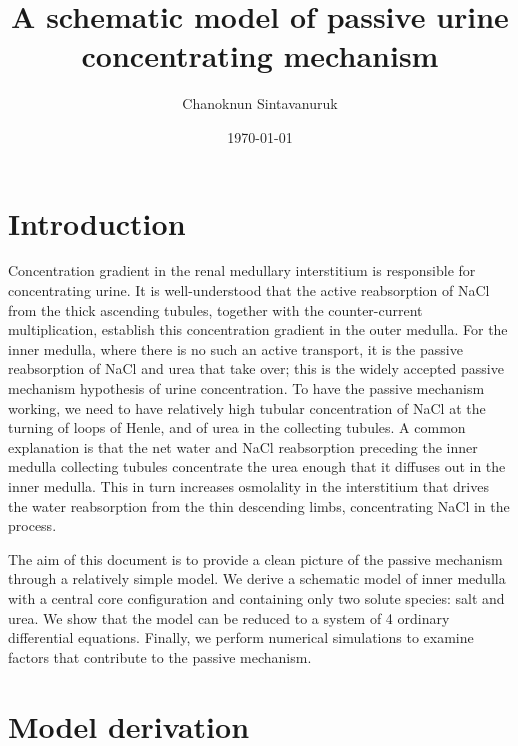 \documentclass{article}
\title{A schematic model of passive urine concentrating mechanism}
\author[1]{Chanoknun Sintavanuruk}
\date{\today}
\numberwithin{equation}{section} %
\begin{document}
\sloppy %
\maketitle

\section{Introduction}

Concentration gradient in the renal medullary interstitium is responsible for concentrating urine.
It is well-understood that the active reabsorption of NaCl from the thick ascending tubules, together with the counter-current multiplication, establish this concentration gradient in the outer medulla.
For the inner medulla, where there is no such an active transport, it is the passive reabsorption of NaCl and urea that take over; this is the widely accepted passive mechanism hypothesis of urine concentration.
To have the passive mechanism working, we need to have relatively high tubular concentration of NaCl at the turning of loops of Henle, and of urea in the collecting tubules.
A common explanation is that the net water and NaCl reabsorption preceding the inner medulla collecting tubules concentrate the urea enough that it diffuses out in the inner medulla.
This in turn increases osmolality in the interstitium that drives the water reabsorption from the thin descending limbs, concentrating NaCl in the process.

The aim of this document is to provide a clean picture of the passive mechanism through a relatively simple model.
We derive a schematic model of inner medulla with a central core configuration and containing only two solute species: salt and urea.
We show that the model can be reduced to a system of 4 ordinary differential equations.
Finally, we perform numerical simulations to examine factors that contribute to the passive mechanism.

\section{Model derivation}

\end{document}
